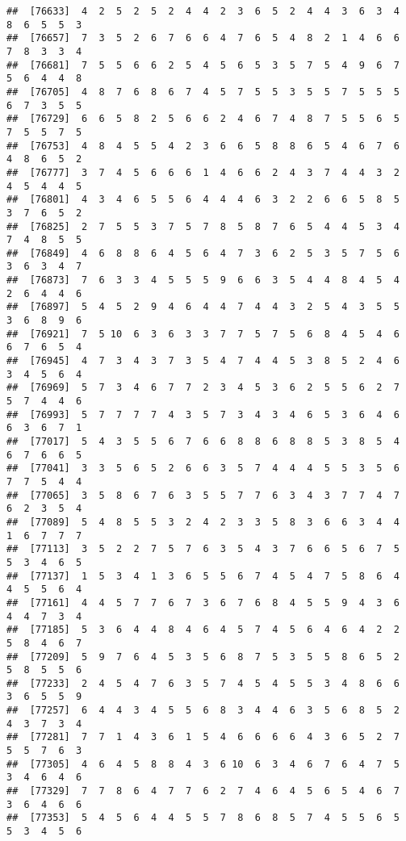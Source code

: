 \documentclass[
]{book}
\begin{document}
\begin{verbatim}
##  [76633]  4  2  5  2  5  2  4  4  2  3  6  5  2  4  4  3  6  3  4  8  6  5  5  3
##  [76657]  7  3  5  2  6  7  6  6  4  7  6  5  4  8  2  1  4  6  6  7  8  3  3  4
##  [76681]  7  5  5  6  6  2  5  4  5  6  5  3  5  7  5  4  9  6  7  5  6  4  4  8
##  [76705]  4  8  7  6  8  6  7  4  5  7  5  5  3  5  5  7  5  5  5  6  7  3  5  5
##  [76729]  6  6  5  8  2  5  6  6  2  4  6  7  4  8  7  5  5  6  5  7  5  5  7  5
##  [76753]  4  8  4  5  5  4  2  3  6  6  5  8  8  6  5  4  6  7  6  4  8  6  5  2
##  [76777]  3  7  4  5  6  6  6  1  4  6  6  2  4  3  7  4  4  3  2  4  5  4  4  5
##  [76801]  4  3  4  6  5  5  6  4  4  4  6  3  2  2  6  6  5  8  5  3  7  6  5  2
##  [76825]  2  7  5  5  3  7  5  7  8  5  8  7  6  5  4  4  5  3  4  7  4  8  5  5
##  [76849]  4  6  8  8  6  4  5  6  4  7  3  6  2  5  3  5  7  5  6  3  6  3  4  7
##  [76873]  7  6  3  3  4  5  5  5  9  6  6  3  5  4  4  8  4  5  4  2  6  4  4  6
##  [76897]  5  4  5  2  9  4  6  4  4  7  4  4  3  2  5  4  3  5  5  3  6  8  9  6
##  [76921]  7  5 10  6  3  6  3  3  7  7  5  7  5  6  8  4  5  4  6  6  7  6  5  4
##  [76945]  4  7  3  4  3  7  3  5  4  7  4  4  5  3  8  5  2  4  6  3  4  5  6  4
##  [76969]  5  7  3  4  6  7  7  2  3  4  5  3  6  2  5  5  6  2  7  5  7  4  4  6
##  [76993]  5  7  7  7  7  4  3  5  7  3  4  3  4  6  5  3  6  4  6  6  3  6  7  1
##  [77017]  5  4  3  5  5  6  7  6  6  8  8  6  8  8  5  3  8  5  4  6  7  6  6  5
##  [77041]  3  3  5  6  5  2  6  6  3  5  7  4  4  4  5  5  3  5  6  7  7  5  4  4
##  [77065]  3  5  8  6  7  6  3  5  5  7  7  6  3  4  3  7  7  4  7  6  2  3  5  4
##  [77089]  5  4  8  5  5  3  2  4  2  3  3  5  8  3  6  6  3  4  4  1  6  7  7  7
##  [77113]  3  5  2  2  7  5  7  6  3  5  4  3  7  6  6  5  6  7  5  5  3  4  6  5
##  [77137]  1  5  3  4  1  3  6  5  5  6  7  4  5  4  7  5  8  6  4  4  5  5  6  4
##  [77161]  4  4  5  7  7  6  7  3  6  7  6  8  4  5  5  9  4  3  6  4  4  7  3  4
##  [77185]  5  3  6  4  4  8  4  6  4  5  7  4  5  6  4  6  4  2  2  5  8  4  6  7
##  [77209]  5  9  7  6  4  5  3  5  6  8  7  5  3  5  5  8  6  5  2  5  8  5  5  6
##  [77233]  2  4  5  4  7  6  3  5  7  4  5  4  5  5  3  4  8  6  6  3  6  5  5  9
##  [77257]  6  4  4  3  4  5  5  6  8  3  4  4  6  3  5  6  8  5  2  4  3  7  3  4
##  [77281]  7  7  1  4  3  6  1  5  4  6  6  6  6  4  3  6  5  2  7  5  5  7  6  3
##  [77305]  4  6  4  5  8  8  4  3  6 10  6  3  4  6  7  6  4  7  5  3  4  6  4  6
##  [77329]  7  7  8  6  4  7  7  6  2  7  4  6  4  5  6  5  4  6  7  3  6  4  6  6
##  [77353]  5  4  5  6  4  4  5  5  7  8  6  8  5  7  4  5  5  6  5  5  3  4  5  6

\end{verbatim}
\end{document}
